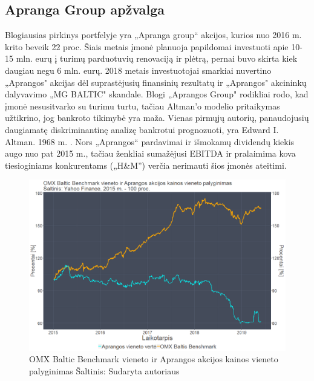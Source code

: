 \documentclass[12pt]{article}
\begin{document}
\subsection{Apranga Group apžvalga}
Blogiausias pirkinys portfelyje yra „Apranga group“ akcijos, kurios nuo 2016 m. krito beveik 22 proc. Šiais metais įmonė planuoja papildomai investuoti apie 10-15 mln. eurų į turimų parduotuvių renovaciją ir plėtrą, pernai buvo skirta kiek daugiau negu 6 mln. eurų. 2018 metais investuotojai smarkiai nuvertino „Aprangos" akcijas dėl suprastėjusių finansinių rezultatų ir „Aprangos" akcininkų dalyvavimo „MG BALTIC" skandale. Blogi  „Aprangos Group" rodikliai rodo, kad įmonė nesusitvarko su turimu turtu, tačiau Altman'o modelio pritaikymas užtikrino, jog bankroto tikimybė yra maža. Vienas pirmųjų autorių, panaudojusių daugiamatę diskriminantinę analizę bankrotui prognozuoti, yra Edward I. Altman. 1968 m. \cite{dzikevivcius2015finansiniku}. Nors „Aprangos“ pardavimai ir išmokamų dividendų kiekis augo nuo pat 2015 m., tačiau ženkliai sumažėjusi EBITDA ir pralaimima kova tiesioginiams konkurentams („H\&M”) verčia nerimauti šios įmonės ateitimi.


\begin{figure}[H]
\captionsetup{justification=centering}
\center
\includegraphics[scale=0.4]{APG.png}
\caption{OMX Baltic Benchmark vieneto ir Aprangos akcijos kainos vieneto palyginimas \newline
Šaltinis: Sudaryta autoriaus}
\end{figure}
\end{document}
